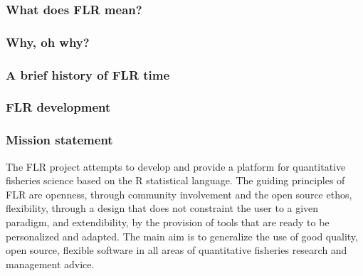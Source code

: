 \begin{frame}\frametitle{What does FLR mean?}

\end{frame}

\begin{frame}\frametitle{Why, oh why?}

\end{frame}

\begin{frame}\frametitle{A brief history of FLR time}

\end{frame}

\begin{frame}\frametitle{FLR development}

\end{frame}

\begin{frame}\frametitle{Mission statement}

The FLR project attempts to develop and provide a platform for
quantitative fisheries science based on the R statistical language. The
guiding principles of FLR are openness, through community involvement
and the open source ethos, flexibility, through a design that does not
constraint the user to a given paradigm, and extendibility, by the
provision of tools that are ready to be personalized and adapted. The
main aim is to generalize the use of good quality, open source, flexible
software in all areas of quantitative fisheries research and management
advice.

\end{frame}

